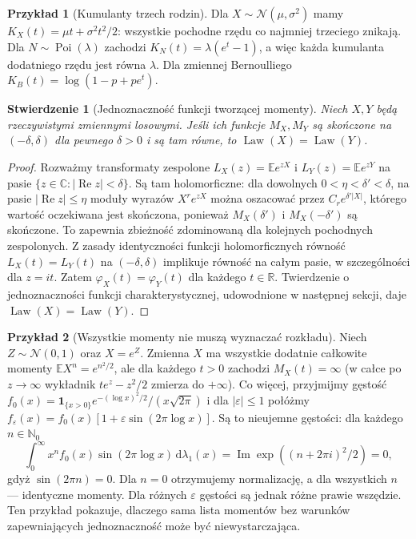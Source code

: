 \documentclass[11pt,a4paper,oneside]{report}
\numberwithin{equation}{chapter}
\theoremstyle{plain}
\newtheorem{stwierdzenie}[twierdzenie]{Stwierdzenie}
\theoremstyle{definition}
\newtheorem{przyklad}{Przykład}[chapter]
\theoremstyle{remark}
\newcommand{\R}{\mathbb{R}}
\newcommand{\N}{\mathbb{N}}
\newcommand{\E}{\mathbb{E}}
\newcommand{\Law}{\operatorname{Law}}
\newcommand{\ind}[1]{\mathbf{1}_{#1}}
\newcommand{\dd}{\mathrm{d}}
\newcommand{\Poi}{\operatorname{Poi}}
\newcommand{\Normal}{\mathcal{N}}
\begin{document}
\begin{przyklad}[Kumulanty trzech rodzin]
Dla $X\sim\Normal(\mu,\sigma^2)$ mamy
$K_X(t)=\mu t+\sigma^2t^2/2$: wszystkie pochodne
rzędu co najmniej trzeciego znikają. Dla
$N\sim\Poi(\lambda)$ zachodzi $K_N(t)=\lambda(e^t-1)$,
a więc każda kumulanta dodatniego rzędu jest równa $\lambda$.
Dla zmiennej Bernoulliego $K_B(t)=\log(1-p+pe^t)$.
\end{przyklad}

\begin{stwierdzenie}[Jednoznaczność funkcji tworzącej momenty]
Niech $X,Y$ będą rzeczywistymi zmiennymi losowymi.
Jeśli ich funkcje $M_X,M_Y$ są skończone na
$(-\delta,\delta)$ dla pewnego $\delta>0$
i są tam równe, to $\Law(X)=\Law(Y)$.
\end{stwierdzenie}
\begin{proof}
Rozważmy transformaty zespolone
$L_X(z)=\E e^{zX}$ i $L_Y(z)=\E e^{zY}$
na pasie $\{z\in\mathbb C:|\operatorname{Re}z|<\delta\}$.
Są tam holomorficzne: dla dowolnych $0<\eta<\delta'
<\delta$, na pasie $|\operatorname{Re}z|\leq\eta$
moduły wyrazów $X^re^{zX}$ można oszacować przez
$C_r e^{\delta'|X|}$, którego wartość oczekiwana
jest skończona, ponieważ $M_X(\delta')$ i
$M_X(-\delta')$ są skończone. To zapewnia zbieżność
zdominowaną dla kolejnych pochodnych zespolonych.
Z zasady identyczności funkcji holomorficznych równość
$L_X(t)=L_Y(t)$ na $(-\delta,\delta)$ implikuje
równość na całym pasie, w szczególności dla $z=it$.
Zatem $\varphi_X(t)=\varphi_Y(t)$ dla każdego $t\in\R$.
Twierdzenie o jednoznaczności funkcji charakterystycznej,
udowodnione w następnej sekcji, daje $\Law(X)=\Law(Y)$.
\end{proof}

\begin{przyklad}[Wszystkie momenty nie muszą wyznaczać rozkładu]
Niech $Z\sim\Normal(0,1)$ oraz $X=e^Z$.
Zmienna $X$ ma wszystkie dodatnie całkowite momenty
$\E X^n=e^{n^2/2}$, ale dla każdego $t>0$ zachodzi
$M_X(t)=\infty$ (w całce po $z\to\infty$ wykładnik
$t e^z-z^2/2$ zmierza do $+\infty$).
Co więcej, przyjmijmy gęstość $f_0(x)=
\ind{\{x>0\}}e^{-(\log x)^2/2}/(x\sqrt{2\pi})$
i dla $|\varepsilon|\leq1$ połóżmy
$f_\varepsilon(x)=f_0(x)[1+\varepsilon\sin(2\pi\log x)]$.
Są to nieujemne gęstości: dla każdego $n\in\N_0$
\[
\int_0^\infty x^n f_0(x)\sin(2\pi\log x)
\,\dd\lambda_1(x)
=\operatorname{Im}\exp((n+2\pi i)^2/2)=0,
\]
gdyż $\sin(2\pi n)=0$. Dla $n=0$ otrzymujemy
normalizację, a dla wszystkich $n$ --- identyczne momenty.
Dla różnych $\varepsilon$ gęstości są jednak różne prawie
wszędzie. Ten przykład pokazuje, dlaczego sama lista momentów
bez warunków zapewniających jednoznaczność może być niewystarczająca.
\end{przyklad}
\end{document}
